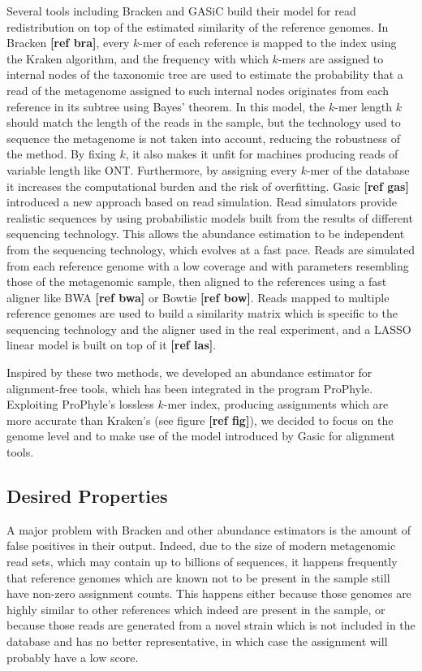 Several tools including Bracken and GASiC build their model for read redistribution on top of the estimated similarity of the reference genomes. In Bracken \textbf{[ref bra]}, every $k$-mer of each reference is mapped to the index using the Kraken algorithm, and the frequency with which $k$-mers are assigned to internal nodes of the taxonomic tree are used to estimate the probability that a read of the metagenome assigned to such internal nodes originates from each reference in its subtree using Bayes' theorem. In this model, the $k$-mer length $k$ should match the length of the reads in the sample, but the technology used to sequence the metagenome is not taken into account, reducing the robustness of the method. By fixing $k$, it also makes it unfit for machines producing reads of variable length like ONT. Furthermore, by assigning every $k$-mer of the database it increases the computational burden and the risk of overfitting.
Gasic \textbf{[ref gas]} introduced a new approach based on read simulation. Read simulators provide realistic sequences by using probabilistic models built from the results of different sequencing technology. This allows the abundance estimation to be independent from the sequencing technology, which evolves at a fast pace. Reads are simulated from each reference genome with a low coverage and with parameters resembling those of the metagenomic sample, then aligned to the references using a fast aligner like BWA \textbf{[ref bwa]} or Bowtie \textbf{[ref bow]}. Reads mapped to multiple reference genomes are used to build a similarity matrix which is specific to the sequencing technology and the aligner used in the real experiment, and a LASSO linear model is built on top of it \textbf{[ref las]}.

Inspired by these two methods, we developed an abundance estimator for alignment-free tools, which has been integrated in the program ProPhyle. Exploiting ProPhyle's lossless $k$-mer index, producing assignments which are more accurate than Kraken's (see figure \textbf{[ref fig]}), we decided to focus on the genome level and to make use of the model introduced by Gasic for alignment tools.

\subsection{Desired Properties}

A major problem with Bracken and other abundance estimators is the amount of false positives in their output. Indeed, due to the size of modern metagenomic read sets, which may contain up to billions of sequences, it happens frequently that reference genomes which are known not to be present in the sample still have non-zero assignment counts. This happens either because those genomes are highly similar to other references which indeed are present in the sample, or because those reads are generated from a novel strain which is not included in the database and has no better representative, in which case the assignment will probably have a low score.

